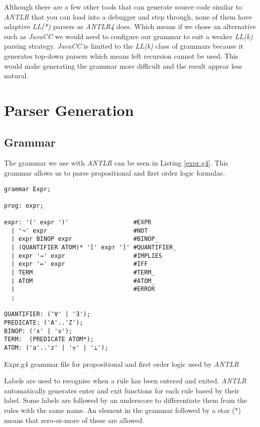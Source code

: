 \documentclass[draft]{report}
\begin{document}
Although there are a few other tools that can generate source code similar to \emph{ANTLR} that you can load into a debugger and step through, none of them have adaptive \emph{LL(*)} parsers as \emph{ANTLR4} does. Which means if we chose an alternative such as \emph{JavaCC} we would need to configure our grammar to suit a weaker \emph{LL(k)} parsing strategy. \emph{JavaCC} is limited to the \emph{LL(k)} class of grammars because it generates top-down parsers which means left recursion cannot be used. This would make generating the grammar more difficult and the result appear less natural.

\section{Parser Generation}

\subsection{Grammar}

The grammar we use with \emph{ANTLR} can be seen in Listing \ref{expr.g4}. This grammar allows us to parse propositional and first order logic formulae.

\begin{listing}[ht]
\begin{verbatim}
grammar Expr; 

prog: expr;

expr: '(' expr ')'                  #EXPR
  | '¬' expr                        #NOT
  | expr BINOP expr                 #BINOP_
  | (QUANTIFIER ATOM)* '[' expr ']' #QUANTIFIER_
  | expr '→' expr                   #IMPLIES
  | expr '↔' expr                   #IFF
  | TERM                            #TERM_
  | ATOM                            #ATOM_
  |                                 #ERROR
  ;

QUANTIFIER: ('∀' | '∃');
PREDICATE: ('A'..'Z');
BINOP: ('∧' | '∨');
TERM:  (PREDICATE ATOM*);
ATOM: ('a'..'z' | '┬' | '⊥');
\end{verbatim}
\caption{Expr.g4 grammar file for propositional and first order logic used by \emph{ANTLR}}
\label{expr.g4}
\end{listing}

Labels are used to recognise when a rule has been entered and exited. \emph{ANTLR} automatically generates enter and exit functions for each rule based by their label. Some labels are followed by an underscore to differentiate them from the rules with the same name. An element in the grammar followed by a star (*) means that zero-or-more of these are allowed.
\end{document}

